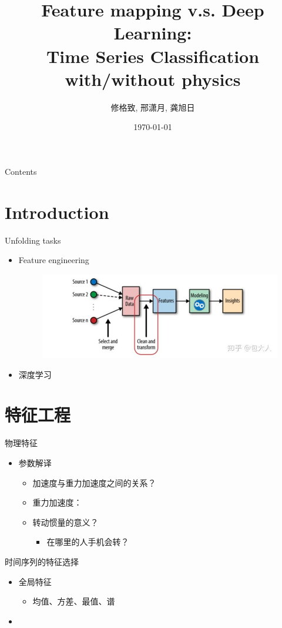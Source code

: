 \documentclass{beamer}
\title{Feature mapping v.s. Deep Learning: \\Time Series Classification with/without physics}
\author{修格致, 邢潇月, 龚旭日}
\institute{Peking University}
\date{\today}
\begin{document}
    \maketitle    
\begin{frame}{Contents}
    \tableofcontents
\end{frame}

\section{Introduction}
\begin{frame}{Unfolding tasks}
    \begin{itemize}
        \item Feature engineering

    \begin{figure}
        \includegraphics[width = 1\linewidth]{./pics/featuremap.jpg}
    \end{figure}
        \item 深度学习
    \end{itemize}

\end{frame}

\section{特征工程}

\begin{frame}{物理特征}
    \begin{itemize}
        \item 参数解译
        \begin{itemize}
            \item 加速度与重力加速度之间的关系？
        \item 重力加速度：
        \item 转动惯量的意义？
        \begin{itemize}
            \item 在哪里的人手机会转？
        \end{itemize}
    \end{itemize}
    \end{itemize}
\end{frame}

\begin{frame}{时间序列的特征选择}
    \begin{itemize}
        \item 全局特征
        \begin{itemize}
            \item 均值、方差、最值、谱
        \end{itemize} 
        \item 
    \end{itemize}
\end{frame}
\end{document}
